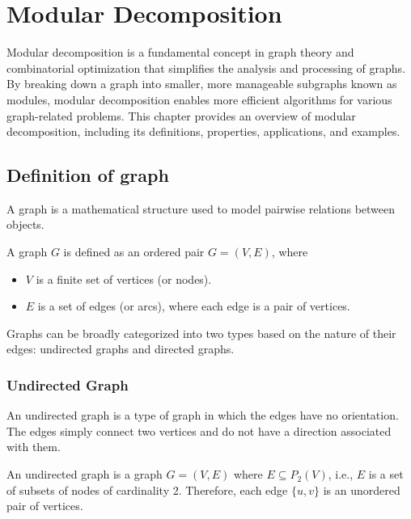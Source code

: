 
\chapter{Modular Decomposition}\label{ch:modular-decomposition}


Modular decomposition is a fundamental concept in graph theory and combinatorial optimization that simplifies the analysis and processing of graphs.
By breaking down a graph into smaller, more manageable subgraphs known as modules, modular decomposition enables more efficient algorithms for various graph-related problems.
This chapter provides an overview of modular decomposition, including its definitions, properties, applications, and examples.


\section{Definition of graph}\label{sec:definition-of-graph}

A graph is a mathematical structure used to model pairwise relations between objects. \cite{GT1,GT2}

\begin{mydef}
    A graph $G$ is defined as an ordered pair $G = (V, E)$, where
    \begin{itemize}
        \item $V$ is a finite set of vertices (or nodes).
        \item $E$ is a set of edges (or arcs), where each edge is a pair of vertices.
    \end{itemize}
\end{mydef}

Graphs can be broadly categorized into two types based on the nature of their edges: undirected graphs and directed graphs.

\subsection*{Undirected Graph}\label{subsec:undirected-graph}

An undirected graph is a type of graph in which the edges have no orientation.
The edges simply connect two vertices and do not have a direction associated with them.

An undirected graph is a graph $G = (V, E)$ where $E \subseteq P_2(V)$, i.e., $E$ is a set of subsets of nodes of cardinality 2.
Therefore, each edge $\{u, v\}$ is an unordered pair of vertices.

